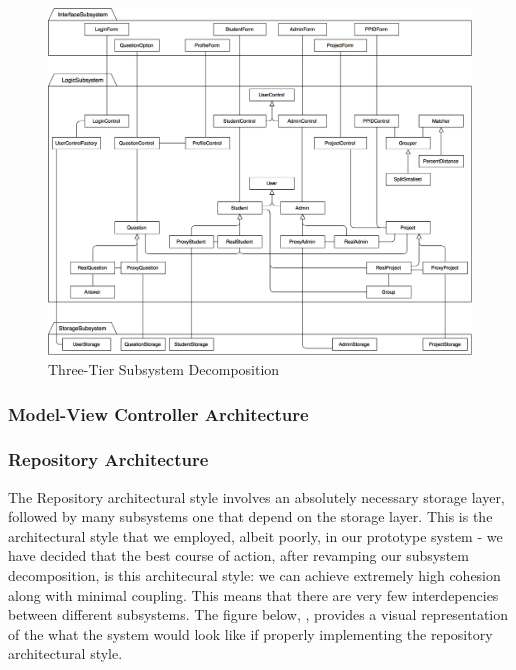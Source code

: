 \documentclass[12pt,letterpaper]{article}
\begin{document}
\begin{figure}[H]
	\centering{}
	\includegraphics[scale=0.22]{imgs/d3/decomp/three-tier.png}
	\caption{Three-Tier Subsystem Decomposition}
\end{figure}
\subsubsection*{Model-View Controller Architecture}
\subsubsection*{Repository Architecture}

The Repository architectural style involves an absolutely necessary storage layer, followed by many subsystems one that depend on the storage layer. This is the architectural style that we employed, albeit poorly, in our prototype system - we have decided that the best course of action, after revamping our subsystem decomposition, is this architecural style: we can achieve extremely high cohesion along with minimal coupling. This means that there are very few interdepencies between different subsystems. The figure below, , provides a visual representation of the what the system would look like if properly implementing the repository architectural style.
\end{document}
